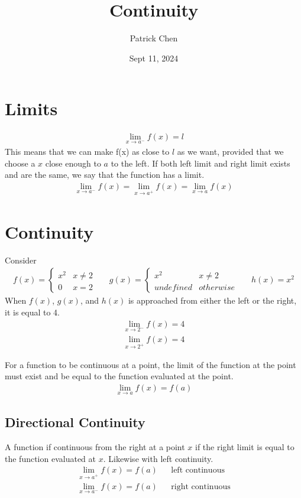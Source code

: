 \documentclass{article}
\title{Continuity}
\author{Patrick Chen}
\date {Sept 11, 2024}
\theoremstyle{mytheoremstyle}
\theoremstyle{mytheoremstyle}
\theoremstyle{myproblemstyle}
\begin{document}
    \maketitle

    \section*{Limits}
    \begin{align*}
        \lim_{x\to a^-} f(x) = l
    \end{align*}
    This means that we can make f(x) as close to $l$ as we want, provided that
    we choose a $x$ close enough to $a$ to the left. If both left limit and
    right limit exists and are the same, we say that the function has a limit.
    \begin{align*}
        \lim_{x\to a^-}f(x) = \lim_{x\to a^+}f(x) = \lim_{x\to a}f(x)
    \end{align*}

    \section*{Continuity}
    Consider
    \begin{align*}
    f(x) =
        \begin{cases}
            x^2 & x\ne 2 \\
            0   & x=2
        \end{cases} &&
    g(x) = 
        \begin{cases}
            x^2 & x\ne 2 \\
            undefined & otherwise
        \end{cases} &&
    h(x) = x^2
    \end{align*}
    When $f(x)$, $g(x)$, and $h(x)$ is approached from either the left or the
    right, it is equal to 4.
    \begin{align*}
        \lim_{x\to2^-} f(x) = 4 \\
        \lim_{x\to2^+} f(x) = 4
    \end{align*}

    For a function to be continuous at a point, the limit of the function at the
    point must exist and be equal to the function evaluated at the point.
    \begin{align*}
        \lim_{x\to a}f(x) = f(a)
    \end{align*}

    \subsection*{Directional Continuity}
    A function if continuous from the right at a point $x$ if the right limit is
    equal to the function evaluated at $x$. Likewise with left continuity.
    \begin{align*}
        \lim_{x\to a^+} f(x) = f(a) && \text{left continuous} \\
        \lim_{x\to a^-} f(x) = f(a) && \text{right continuous}
    \end{align*}
\end{document}
